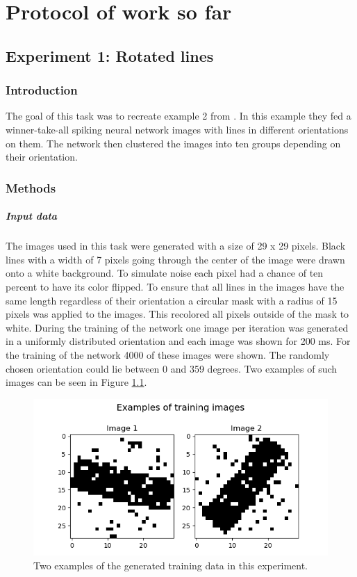 \chapter{Protocol of work so far}
\section{Experiment 1: Rotated lines}

\subsection{Introduction}
The goal of this task was to recreate example 2 from \citet{nessler}. In this example they fed a winner-take-all spiking neural network images with lines in different orientations on them. The network then clustered the images into ten groups depending on their orientation.

\subsection{Methods}
\paragraph{Input data}
The images used in this task were generated with a size of 29 x 29 pixels. Black lines with a width of 7 pixels going through the center of the image were drawn onto a white background. To simulate noise each pixel had a chance of ten percent to have its color flipped. To ensure that all lines in the images have the same length regardless of their orientation a circular mask with a radius of 15 pixels was applied to the images. This recolored all pixels outside of the mask to white. During the training of the network one image per iteration was generated in a uniformly distributed orientation and each image was shown for 200 ms. For the training of the network 4000 of these images were shown. The randomly chosen orientation could lie between 0 and 359 degrees.  Two examples of such images can be seen in Figure \ref{fig:angleImages}.

\begin{figure}
  \includegraphics[width=\linewidth]{figures/angleNetwork/trainingImages.png}
  \caption{Two examples of the generated training data in this experiment.}
  \label{fig:angleImages}
\end{figure}


